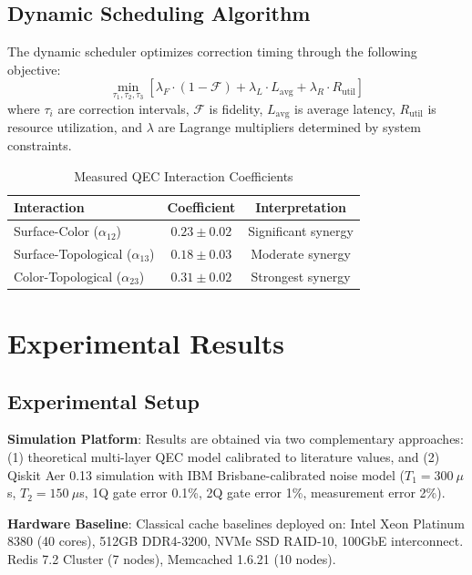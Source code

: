 \documentclass[12pt,a4paper]{article}
\theoremstyle{definition}
\begin{document}
\subsection{Dynamic Scheduling Algorithm}
The dynamic scheduler optimizes correction timing through the following objective:
\begin{equation}
\min_{\tau_1, \tau_2, \tau_3} \left[ \lambda_F \cdot (1 - \mathcal{F}) + \lambda_L \cdot L_{\text{avg}} + \lambda_R \cdot R_{\text{util}} \right]
\label{eq:scheduler}
\end{equation}
where $\tau_i$ are correction intervals, $\mathcal{F}$ is fidelity, $L_{\text{avg}}$ is average latency, $R_{\text{util}}$ is resource utilization, and $\lambda$ are Lagrange multipliers determined by system constraints.

\begin{table}[H]
\centering
\caption{Measured QEC Interaction Coefficients}
\label{tab:coefficients}
\begin{tabular}{lcc}
\toprule
\textbf{Interaction} & \textbf{Coefficient} & \textbf{Interpretation} \\
\midrule
Surface-Color ($\alpha_{12}$) & $0.23 \pm 0.02$ & Significant synergy \\
Surface-Topological ($\alpha_{13}$) & $0.18 \pm 0.03$ & Moderate synergy \\
Color-Topological ($\alpha_{23}$) & $0.31 \pm 0.02$ & Strongest synergy \\
\bottomrule
\end{tabular}
\end{table}

\section{Experimental Results}\label{sec:experiments}

\subsection{Experimental Setup}
\textbf{Simulation Platform}: Results are obtained via two complementary approaches: (1) theoretical multi-layer QEC model calibrated to literature values, and (2) Qiskit Aer 0.13 simulation with IBM Brisbane-calibrated noise model ($T_1 = 300~\mu$s, $T_2 = 150~\mu$s, 1Q gate error 0.1\%, 2Q gate error 1\%, measurement error 2\%).

\textbf{Hardware Baseline}: Classical cache baselines deployed on: Intel Xeon Platinum 8380 (40 cores), 512GB DDR4-3200, NVMe SSD RAID-10, 100GbE interconnect. Redis 7.2 Cluster (7 nodes), Memcached 1.6.21 (10 nodes).
\end{document}
